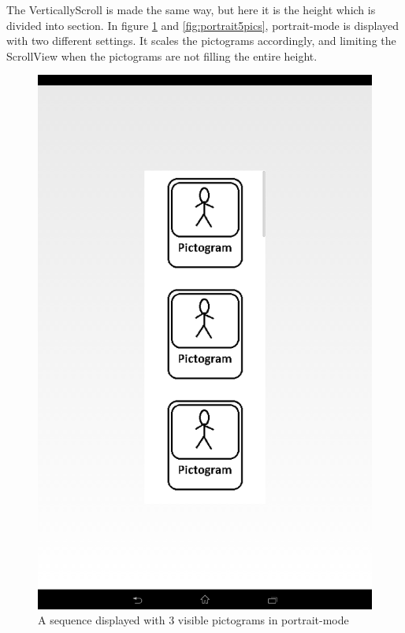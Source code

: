 The VerticallyScroll is made the same way, but here it is the height which is divided into section. In figure \ref{fig:portrait3pics} and \ref{fig:portrait5pics}, portrait-mode is displayed with two different settings. It scales the pictograms accordingly, and limiting the ScrollView when the pictograms are not filling the entire height.

\begin{figure}[ht!]
\centering
\begin{minipage}{.45\textwidth}
\centering
\includegraphics[scale=0.1]{Pics/Sprint3/portrait3pics.png}
\caption{A sequence displayed with 3 visible pictograms in portrait-mode}
\label{fig:portrait3pics}
\end{minipage}\hfill

\end{figure}
